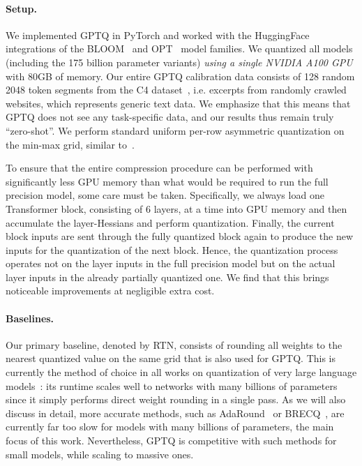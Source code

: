 \paragraph{Setup.} We implemented GPTQ in PyTorch \cite{paszke2019pytorch} and worked with the HuggingFace integrations of the BLOOM~\cite{laurencconbigscience} and OPT~\cite{zhang2022opt} model families. We quantized all models (including the 175 billion parameter variants) \emph{using a single NVIDIA A100 GPU} with 80GB of memory. 
Our entire GPTQ calibration data consists of 128 random 2048 token segments from the C4 dataset~\cite{C4}, i.e. excerpts from randomly crawled websites, which represents generic text data. 
We emphasize that this means that GPTQ does not see any task-specific data, and our results thus remain truly ``zero-shot''. 
We perform standard uniform per-row asymmetric quantization on the min-max grid, similar to~\cite{dettmers2022llm}.

To ensure that the entire compression procedure can be performed with significantly less GPU memory than what would be required to run the full precision model, some care must be taken. Specifically, we always load one Transformer block, consisting of 6 layers, at a time into GPU memory and then accumulate the layer-Hessians and perform quantization. Finally, the current block inputs are sent through the fully quantized block again to produce the new inputs for the quantization of the next block. Hence, the quantization process operates not on the layer inputs in the full precision model but on the actual layer inputs in the already partially quantized one. We find that this brings noticeable improvements at negligible extra cost.

\paragraph{Baselines.} Our primary baseline, denoted by RTN, consists of rounding all weights to the nearest quantized value on the same grid that is also used for GPTQ. This is currently the method of choice in all works on quantization of very large language models~\cite{dettmers2022llm, yao2022zeroquant, park2022nuqmm}: its runtime scales well to networks with many billions of parameters since it simply performs direct weight rounding in a single pass. As we will also discuss in detail, more accurate methods, such as AdaRound~\cite{nagel2020up} or BRECQ~\cite{li2021brecq}, are currently far too slow for models with many billions of parameters, the main focus of this work. Nevertheless, GPTQ is competitive with such methods for small models, while scaling to massive ones.

